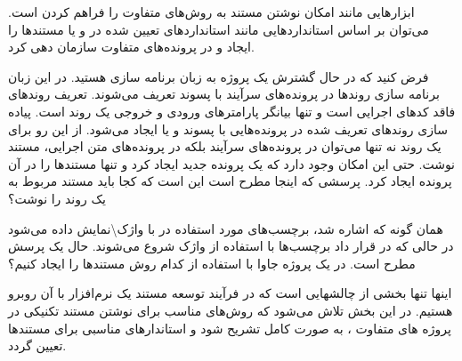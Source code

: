 ابزارهایی مانند  امکان نوشتن مستند به روش‌های متفاوت
را فراهم کردن است. می‌توان بر اساس  استانداردهایی مانند استانداردهای تعیین
شده در  و یا  مستندها را ایجاد و در پرونده‌های متفاوت
سازمان دهی کرد.

    فرض کنید که در حال گشترش یک پروژه به زبان برنامه سازی  هستید. در
    این زبان برنامه سازی روندها در پرونده‌های سرآیند با پسوند  تعریف
    می‌شوند. تعریف روندهای فاقد کدهای اجرایی است و تنها بیانگر پارامترهای ورودی
    و خروجی یک روند است. پیاده سازی روندهای تعریف شده در  پرونده‌هایی با پسوند
     و یا  ایجاد می‌شود. از این رو برای یک روند نه تنها می‌توان
    در پرونده‌های سرآیند بلکه در پرونده‌های متن اجرایی، مستند نوشت. حتی این
    امکان وجود دارد که یک پرونده جدید  ایجاد کرد و تنها مستندها را در آن پرونده
    ایجاد کرد. پرسشی که اینجا مطرح است این است که کجا باید مستند  مربوط به یک
    روند را نوشت؟

    همان گونه که اشاره شد، برچسب‌های مورد استفاده در  با
    واژک\textbackslash نمایش داده می‌شود در حالی که در قرار داد  
    برچسب‌ها با استفاده از واژک  شروع  می‌شوند. حال یک پرسش مطرح است. در
    یک پروژه جاوا با استفاده از کدام روش مستندها را ایجاد کنیم؟

    اینها تنها بخشی از چالشهایی است که در فرآیند توسعه مستند یک نرم‌افزار با آن
    روبرو  هستیم. در این بخش تلاش می‌شود که روش‌های مناسب برای نوشتن مستند
    تکنیکی در پروژه های متفاوت ، به صورت  کامل تشریح شود و استاندارهای مناسبی
    برای مستندها تعیین گردد.






%
